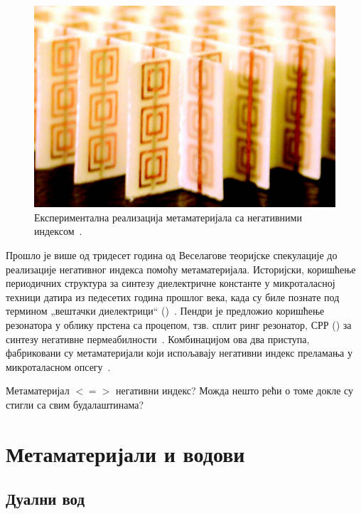 \begin{figure}[h]
    \centering
    \includegraphics[width=0.8\linewidth]{sl_uvod/mm_smit.jpg}
    \caption{Експериментална реализација метаматеријала са негативними индексом~\cite{smith:00}.}
    \label{uvod:mm_smit}
\end{figure}
Прошло је више од тридесет година од Веселагове теоријске спекулације до реализације негативног индекса помоћу метаматеријала. Историјски, коришћење периодичних структура за синтезу диелектричне константе у микроталасној техници датира из педесетих година прошлог века, када су биле познате под термином „вештачки диелектрици`` ()~\cite{rotman1962plasma}. Пендри је предложио коришћење резонатора у облику прстена са процепом, тзв. сплит ринг резонатор, СРР () за синтезу негативне пермеабилности~\cite{pendri:99}. Комбинацијом ова два приступа, фабриковани су метаматеријали који испољавају негативни индекс преламања у микроталасном опсегу~\cite{smith:00}.

Метаматеријал $<=>$ негативни индекс? Можда нешто рећи о томе докле су стигли са свим будалаштинама?

\section{Метаматеријали и водови}

\subsection{Дуални вод}

